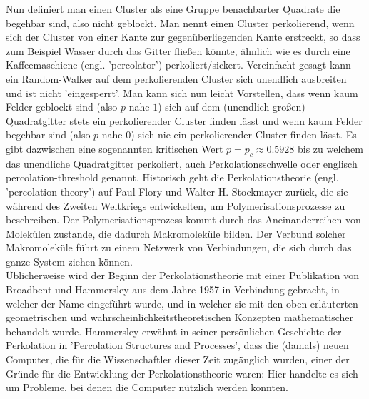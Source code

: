 \documentclass[a4paper, 12pt]{report}
\begin{document}
Nun definiert man einen Cluster als eine Gruppe benachbarter Quadrate die begehbar sind, also nicht geblockt. Man nennt einen Cluster perkolierend, wenn sich der Cluster von einer Kante zur gegenüberliegenden Kante erstreckt, so dass zum Beispiel Wasser durch das Gitter fließen könnte, ähnlich wie es durch eine Kaffeemaschiene (engl. 'percolator') perkoliert/sickert. Vereinfacht gesagt kann ein Random-Walker auf dem perkolierenden Cluster sich unendlich ausbreiten und ist nicht 'eingesperrt'. Man kann sich nun leicht Vorstellen, dass wenn kaum Felder geblockt sind (also $p$ nahe $1$) sich auf dem (unendlich großen) Quadratgitter stets ein perkolierender Cluster finden lässt und wenn kaum Felder begehbar sind (also $p$ nahe $0$) sich nie ein perkolierender Cluster finden lässt. Es gibt dazwischen eine sogenannten kritischen Wert $p=p_c \approx 0.5928$ \cite{Stauffer} bis zu welchem das unendliche Quadratgitter perkoliert, auch Perkolationsschwelle oder englisch percolation-threshold genannt.
\noindent Historisch geht die Perkolationstheorie (engl. 'percolation theory') auf Paul Flory und Walter H. Stockmayer zurück, die sie während des Zweiten Weltkriegs entwickelten, um Polymerisationsprozesse zu beschreiben. Der Polymerisationsprozess kommt durch das Aneinanderreihen von Molekülen zustande, die dadurch Makromoleküle bilden. Der Verbund solcher Makromoleküle führt zu einem Netzwerk von Verbindungen, die sich durch das ganze System ziehen können.\cite{Wiki_Perkolationstheorie}
\\
\noindent Üblicherweise wird der Beginn der Perkolationstheorie mit einer Publikation von Broadbent  und Hammersley aus dem Jahre 1957 in Verbindung gebracht, in welcher der Name eingeführt wurde, und in welcher sie mit den oben erläuterten geometrischen und wahrscheinlichkeitstheoretischen Konzepten mathematischer behandelt wurde. Hammersley erwähnt in seiner persönlichen Geschichte der Perkolation in 'Percolation Structures and Processes', dass die (damals) neuen Computer, die für die Wissenschaftler dieser Zeit zugänglich wurden, einer der Gründe für die Entwicklung der Perkolationstheorie waren: Hier handelte es sich um Probleme, bei denen die Computer nützlich werden konnten.
\end{document}
